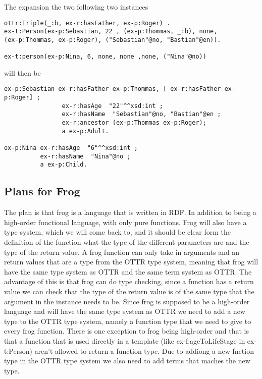 The expansion the two following two instances

\begin{lstlisting}[frame=single]
ottr:Triple(_:b, ex-r:hasFather, ex-p:Roger) .
ex-t:Person(ex-p:Sebastian, 22 , (ex-p:Thommas, _:b), none, 
(ex-p:Thommas, ex-p:Roger), ("Sebastian"@no, "Bastian"@en)).

ex-t:person(ex-p:Nina, 6, none, none ,none, ("Nina"@no))
\end{lstlisting}

will then be
\begin{lstlisting}[frame=single, language=turtle]
ex-p:Sebastian ex-r:hasFather ex-p:Thommas, [ ex-r:hasFather ex-p:Roger] ; 
                ex-r:hasAge  "22"^^xsd:int ; 
                ex-r:hasName  "Sebastian"@no, "Bastian"@en ;
                ex-r:ancestor (ex-p:Thommas ex-p:Roger);
                a ex-p:Adult.

ex-p:Nina ex-r:hasAge  "6"^^xsd:int ; 
          ex-r:hasName  "Nina"@no ;
          a ex-p:Child.
\end{lstlisting}

\subsection{Plans for Frog}
The plan is that frog is a language that is written in RDF. In addition to being a high-order functional language, 
with only pure functions. 
Frog will also have a type system, which we will come back to, and it should be clear form the definition of 
the function what the type of the different parameters are and the type of the return value. 
A frog function can only take in arguments and an return values that are a type from the OTTR type system, 
meaning that frog will have the same type system as OTTR and the same term system as OTTR.
The advantage of this is that frog can do type checking, since a function has a return value we can check that 
the type of the return value is of the same type that the argument in the instance needs to be.
Since frog is supposed to be a high-order language and will have the same type system as OTTR  
we need to add a new type to the OTTR type system, namely a function type that we need to give to every frog function. 
There is one exception to frog being high-order and that is that a function that is used directly in a 
template (like ex-f:ageToLifeStage in ex-t:Person) aren't allowed to return a function type. Due to addiong a new 
fnction type in the OTTR type system we also need to add terms that maches the new type. 

